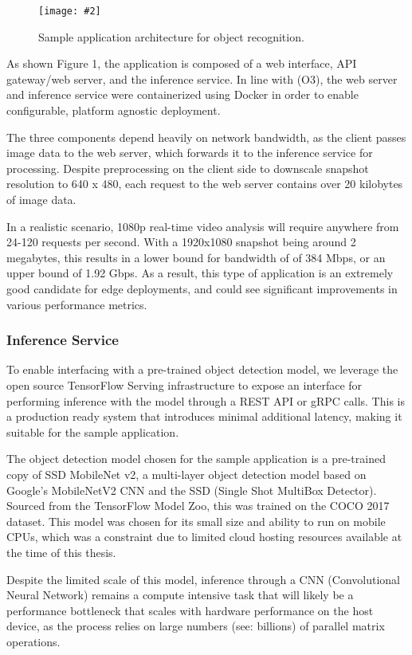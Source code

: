 \documentclass[11pt]{article}
\newcommand{\capfigure}[3][0.5] {
    \begin{figure}[H]
    \centering
    \texttt{[image: \#2]}
    \caption{#3}
    \end{figure}
}
\begin{document}
\capfigure[0.75]{images/applicationdesign1}{Sample application architecture for object recognition.}

As shown Figure 1, the application is composed of a web interface, API gateway/web server, 
and the inference service. In line with (O3), the web server and inference service were 
containerized using Docker in order to enable configurable, platform agnostic deployment.\newline

The three components depend heavily on network bandwidth, as the client passes image data to the
web server, which forwards it to the inference service for processing. Despite preprocessing on the 
client side to downscale snapshot resolution to 640 x 480, each request to the web server contains 
over 20 kilobytes of image data. \newline

In a realistic scenario, 1080p real-time video analysis will require anywhere from 24-120 requests 
per second. With a 1920x1080 snapshot being around 2 megabytes, this results in a lower bound for 
bandwidth of of 384 Mbps, or an upper bound of 1.92 Gbps. As a result, this type of application is 
an extremely good candidate for edge deployments, and could see significant improvements in
various performance metrics.

\subsubsection{Inference Service}
To enable interfacing with a pre-trained object detection model, we leverage the open source
TensorFlow Serving infrastructure to expose an interface for performing inference with the model 
through a REST API or gRPC calls. This is a production ready system that introduces minimal
additional latency, making it suitable for the sample application.\newline

The object detection model chosen for the sample application is a pre-trained copy of SSD 
MobileNet v2, a multi-layer object detection model based on Google's MobileNetV2 CNN and the SSD 
(Single Shot MultiBox Detector). Sourced from the TensorFlow Model Zoo, this was trained on the 
COCO 2017 dataset. This model was chosen for its small size and ability to run on mobile CPUs, 
which was a constraint due to limited cloud hosting resources available at the time of this thesis.
\newline

Despite the limited scale of this model, inference through a CNN (Convolutional Neural Network) 
remains a compute intensive task that will likely be a performance bottleneck that scales with 
hardware performance on the host device, as the process relies on large numbers (see: billions) 
of parallel matrix operations.\newline
\end{document}
